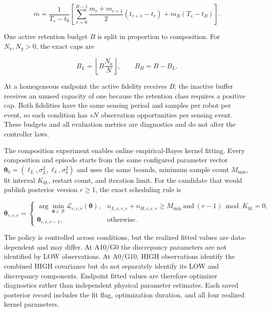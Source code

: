 \documentclass[11pt]{article}
\begin{document}
\begin{equation}
\overline m
=
\frac{1}{T_s-t_0}
\left[
\sum_{r=0}^{R-1}
\frac{m_r+m_{r+1}}{2}(t_{r+1}-t_r)
+m_R(T_s-t_R)
\right].
\end{equation}


One active retention budget $B$ is split in proportion to composition. For
$N_a,N_g>0$, the exact caps are


\begin{equation}
B_L
=
\left\lfloor B\frac{N_a}{N}\right\rfloor,
\qquad
B_H
=
B-B_L.
\end{equation}


At a homogeneous endpoint the active fidelity receives $B$; the inactive
buffer receives an unused capacity of one because the retention class requires
a positive cap. Both fidelities have the same sensing period and samples per
robot per event, so each condition has $sN$ observation opportunities per
sensing event. These budgets and all evaluation metrics are diagnostics and do
not alter the controller laws.


The composition experiment enables online empirical-Bayes kernel fitting.
Every composition and episode starts from the same configured parameter vector
$\boldsymbol\theta_0=(\ell_L,\sigma_L^2,\ell_\delta,\sigma_\delta^2)$ and uses
the same bounds, minimum sample count $M_{\min}$, fit interval
$K_{\mathrm{fit}}$, restart count, and iteration limit. For the candidate that
would publish posterior version $r\ge1$, the exact scheduling rule is


\begin{equation}
\boldsymbol\theta_{c,e,r}
=
\begin{cases}
\displaystyle\arg\min_{\boldsymbol\theta\in\mathcal B}
\mathcal L_{c,e,r}(\boldsymbol\theta),
& n_{L,c,e,r}+n_{H,c,e,r}\ge M_{\min}
\ \text{and}\ (r-1)\bmod K_{\mathrm{fit}}=0,\\
\boldsymbol\theta_{c,e,r-1}, & \text{otherwise}.
\end{cases}
\end{equation}


The policy is controlled across conditions, but the realized fitted values are
data-dependent and may differ. At A10/G0 the discrepancy parameters are not
identified by LOW observations. At A0/G10, HIGH observations identify the
combined HIGH covariance but do not separately identify its LOW and
discrepancy components. Endpoint fitted values are therefore optimizer
diagnostics rather than independent physical parameter estimates. Each saved
posterior record includes the fit flag, optimization duration, and all four
realized kernel parameters.
\end{document}
